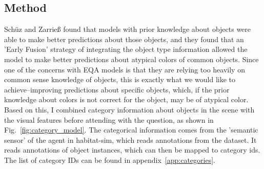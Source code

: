 \subsection{Method}
Schüz and Zarrieß found that models with prior knowledge about objects were able to make better predictions about those objects, and they found that an 'Early Fusion' strategy of integrating the object type information allowed the model to make better predictions about atypical colors of common objects\cite{colorknowledge}. Since one of the concerns with EQA models is that they are relying too heavily on common sense knowledge of objects, this is exactly what we would like to achieve--improving predictions about specific objects, which, if the prior knowledge about colors is not correct for the object, may be of atypical color. Based on this, I combined category information about objects in the scene with the visual features before attending with the question, as shown in Fig.~\ref{fig:category_model}. The categorical information comes from the 'semantic sensor' of the agent in habitat-sim, which reads annotations from the dataset. It reads annotations of object instances, which can then be mapped to category ids. The list of category IDs can be found in appendix~\ref{app:categories}. 

